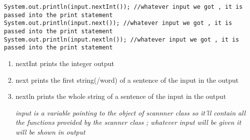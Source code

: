\documentclass[11pt]{article}
\begin{document}
\begin{verbatim}
System.out.println(input.nextInt()); //whatever input we got , it is passed into the print statement
System.out.println(input.next()); //whatever input we got , it is passed into the print statement
System.out.println(input.nextln()); //whatever input we got , it is passed into the print statement
\end{verbatim}

\begin{enumerate}
\item nextInt prints the integer output
\item next prints the first string(/word) of a sentence of the input in the output
\item nextln prints the whole string of a sentence of the input in the output

\emph{input is a variable pointing to the object of scannner class so it'll contain all the functions provided by the scanner class ; whatever input will be given it will be shown in output}
\end{enumerate}
\end{document}
